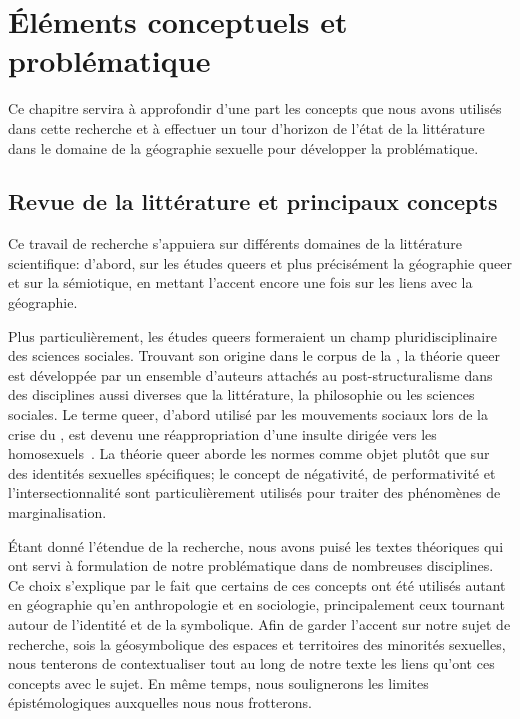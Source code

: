 \chapter{Éléments conceptuels et problématique}
\label{cha:elements_conceptuels_et_problematique}


Ce chapitre servira à approfondir d'une part les concepts que nous avons utilisés dans cette recherche et à effectuer un tour d'horizon de l'état de la littérature dans le domaine de la géographie sexuelle pour développer la problématique.

\section{Revue de la littérature et principaux concepts}
\label{sec:revue_de_la_litterature_et_principaux_concepts}

Ce travail de recherche s’appuiera sur différents domaines de la littérature scientifique: d'abord, sur les études queers et plus précisément la géographie queer et sur la sémiotique, en mettant l'accent encore une fois sur les liens avec la géographie.

Plus particulièrement, les études queers formeraient un champ pluridisciplinaire des sciences sociales.
Trouvant son origine dans le corpus de la , la théorie queer est développée par un ensemble d'auteurs attachés au post-structuralisme dans des disciplines aussi diverses que la littérature, la philosophie ou les sciences sociales.
Le terme queer, d'abord utilisé par les mouvements sociaux \lgbt{} lors de la crise du \vih{}, est devenu une réappropriation d'une insulte dirigée vers les homosexuels~\citep{Laprade2014}.
La théorie queer aborde les normes  comme objet plutôt que sur des identités sexuelles spécifiques; le concept de négativité, de performativité et l'intersectionnalité sont particulièrement utilisés pour traiter des phénomènes de marginalisation.

Étant donné l'étendue de la recherche, nous avons puisé les textes théoriques qui ont servi à formulation de notre problématique dans de nombreuses disciplines.
Ce choix s'explique par le fait que certains de ces concepts ont été utilisés autant en géographie qu'en anthropologie et en sociologie, principalement ceux tournant autour de l'identité et de la symbolique.
Afin de garder l’accent sur notre sujet de recherche, sois la géosymbolique des espaces et territoires des minorités sexuelles, nous tenterons de contextualiser tout au long de notre texte les liens qu'ont ces concepts avec le sujet.
En même temps, nous soulignerons les limites épistémologiques auxquelles nous nous frotterons.


